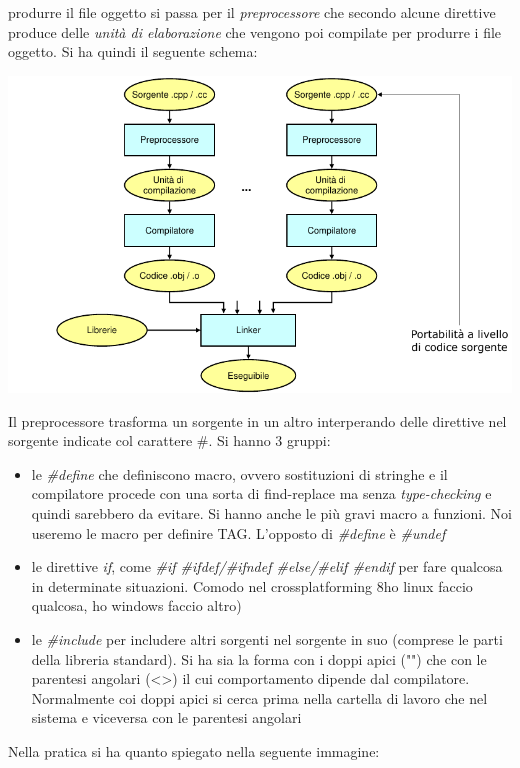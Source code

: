 \documentclass[a4paper,12pt, oneside]{book}
\begin{document}
produrre il file oggetto si passa per il \textit{preprocessore} che
secondo alcune direttive produce delle \textit{unità di elaborazione}
che vengono poi compilate per produrre i file oggetto. Si ha quindi il
seguente schema:
\begin{center}
  \includegraphics[scale = 0.6]{img/proc.png}
\end{center}
Il preprocessore trasforma un sorgente in un altro interperando delle
direttive nel sorgente indicate col carattere \#. Si hanno 3
gruppi:
\begin{itemize}
  \item le \textit{\#define} che definiscono macro, ovvero sostituzioni di
  stringhe e il compilatore procede con una sorta di find-replace ma
  senza \textit{type-checking} e quindi sarebbero da evitare. Si hanno
  anche le più gravi macro a funzioni. Noi useremo le macro per definire
  TAG. L'opposto di \textit{\#define} è \textit{\#undef}
  \item le direttive \textit{if}, come \textit{\#if \#ifdef/\#ifndef
    \#else/\#elif \#endif} per fare qualcosa in determinate
  situazioni. Comodo nel crossplatforming 8ho linux faccio qualcosa, ho
  windows faccio altro)
  \item le \textit{\#include} per includere altri sorgenti nel sorgente
  in suo (comprese le parti della libreria standard). Si ha sia la forma
  con i doppi apici ("") che con le parentesi angolari (<>) il cui
  comportamento dipende dal compilatore. Normalmente coi doppi apici si
  cerca prima nella cartella di lavoro che nel sistema e viceversa con
  le parentesi angolari
\end{itemize}
\newpage
Nella pratica si ha quanto spiegato nella seguente immagine:
\end{document}
